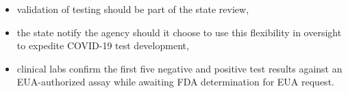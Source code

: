 \begin{itemize}
    \item validation of testing should be part of the state review,
    \item the state notify the agency should it choose to use this flexibility in oversight to expedite COVID-19 test development,
    \item clinical labs confirm the first five negative and positive test results against an EUA-authorized assay while awaiting FDA determination for EUA request.\cite{FDA20200306}
\end{itemize}